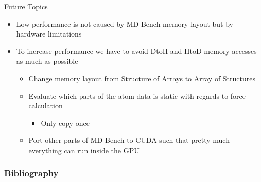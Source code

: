 \documentclass[12pt,xcolor={rgb},t]{beamer}
\begin{document}
\begin{frame}[fragile]{Future Topics}

    \begin{itemize}
        \item Low performance is not caused by MD-Bench memory layout but by hardware limitations
        \item To increase performance we have to avoid DtoH and HtoD memory accesses as much as possible
        \begin{itemize}
            \item Change memory layout from Structure of Arrays to Array of Structures
            \item Evaluate which parts of the atom data is static with regards to force calculation
            \begin{itemize}
                \item Only copy once
            \end{itemize}
            \item Port other parts of MD-Bench to CUDA such that pretty much everything can run inside the GPU
        \end{itemize}
    \end{itemize}
    
\end{frame}

\begin{frame}[allowframebreaks]

    \frametitle{Bibliography}
    
    

\end{frame}
\end{document}
